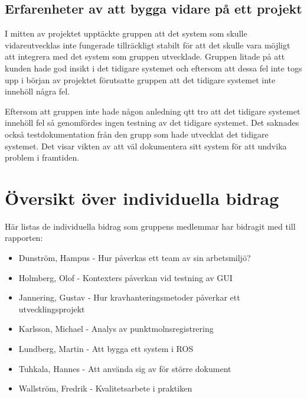 \subsection{Erfarenheter av att bygga vidare på ett projekt}

I mitten av projektet upptäckte gruppen att det system som skulle vidareutvecklas inte fungerade tillräckligt stabilt för att det skulle vara möjligt att integrera med det system som gruppen utvecklade. Gruppen litade på att kunden hade god insikt i det tidigare systemet och eftersom att dessa fel inte togs upp i början av projektet förutsatte gruppen att det tidigare systemet inte innehöll några fel.

Eftersom att gruppen inte hade någon anledning qtt tro att det tidigare systemet innehöll fel så genomfördes ingen testning av det tidigare systemet. Det saknades också testdokumentation från den grupp som hade utvecklat det tidigare systemet. Det visar vikten av att väl dokumentera sitt system för att undvika problem i framtiden.


\section{Översikt över individuella bidrag}

Här listas de individuella bidrag som gruppens medlemmar har bidragit med till rapporten:

\begin{itemize}
	\item Dunström, Hampus - Hur påverkas ett team av sin arbetsmiljö?
	\item Holmberg, Olof - Kontexters påverkan vid testning av GUI
	\item Jannering, Gustav - Hur kravhanteringsmetoder påverkar ett utvecklingsprojekt
	\item Karlsson, Michael - Analys av punktmolnsregistrering
	\item Lundberg, Martin - Att bygga ett system i ROS
	\item Tuhkala, Hannes - Att använda sig av \latex för större dokument
	\item Wallström, Fredrik - Kvalitetsarbete i praktiken
\end{itemize}


